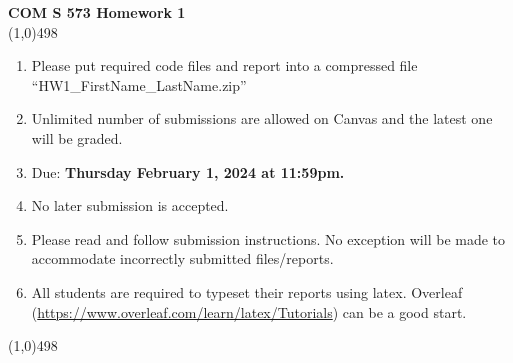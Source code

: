 \documentclass[11pt]{article}
\begin{document}
\begin{center}
{\Large \textbf{COM S 573 Homework 1}}\\

\linethickness{1mm}\line(1,0){498}

\begin{enumerate}
\item Please put required code files and report into a
compressed file ``HW1\_FirstName\_LastName.zip''
\item Unlimited number of submissions are
allowed on Canvas and the latest one will be graded.
\item Due: \textbf{Thursday February 1, 2024 at 11:59pm.}
\item {\color{red} No later submission is accepted.}
\item Please read and follow submission instructions. No exception
will be made to accommodate incorrectly submitted files/reports.
\item All students are required to typeset their reports using
latex. Overleaf
(\url{https://www.overleaf.com/learn/latex/Tutorials}) can be a
good start.
\end{enumerate}

\linethickness{1mm}\line(1,0){498}

\end{center}


\end{document}
